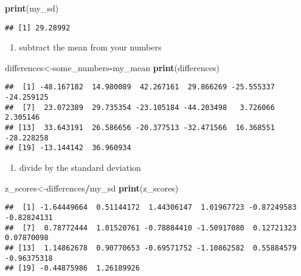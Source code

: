 \documentclass[
]{book}
\newenvironment{Shaded}{\begin{snugshade}}{\end{snugshade}}
\newcommand{\FunctionTok}[1]{\textcolor[rgb]{0.13,0.29,0.53}{\textbf{#1}}}
\newcommand{\NormalTok}[1]{#1}
\newcommand{\OtherTok}[1]{\textcolor[rgb]{0.56,0.35,0.01}{#1}}
\newcommand{\SpecialCharTok}[1]{\textcolor[rgb]{0.81,0.36,0.00}{\textbf{#1}}}
\providecommand{\tightlist}{%
  \setlength{\itemsep}{0pt}\setlength{\parskip}{0pt}}
\begin{document}
\begin{Shaded}
\begin{Highlighting}[]
\FunctionTok{print}\NormalTok{(my\_sd)}
\end{Highlighting}
\end{Shaded}

\begin{verbatim}
## [1] 29.28992
\end{verbatim}

\begin{enumerate}
\def\labelenumi{\arabic{enumi}.}
\setcounter{enumi}{2}
\tightlist
\item
  subtract the mean from your numbers
\end{enumerate}

\begin{Shaded}
\begin{Highlighting}[]
\NormalTok{differences}\OtherTok{\textless{}{-}}\NormalTok{some\_numbers}\SpecialCharTok{{-}}\NormalTok{my\_mean}
\FunctionTok{print}\NormalTok{(differences)}
\end{Highlighting}
\end{Shaded}

\begin{verbatim}
##  [1] -48.167182  14.980089  42.267161  29.866269 -25.555337 -24.259125
##  [7]  23.072389  29.735354 -23.105184 -44.203498   3.726066   2.305146
## [13]  33.643191  26.586656 -20.377513 -32.471566  16.368551 -28.228258
## [19] -13.144142  36.960934
\end{verbatim}

\begin{enumerate}
\def\labelenumi{\arabic{enumi}.}
\setcounter{enumi}{3}
\tightlist
\item
  divide by the standard deviation
\end{enumerate}

\begin{Shaded}
\begin{Highlighting}[]
\NormalTok{z\_scores}\OtherTok{\textless{}{-}}\NormalTok{differences}\SpecialCharTok{/}\NormalTok{my\_sd}
\FunctionTok{print}\NormalTok{(z\_scores)}
\end{Highlighting}
\end{Shaded}

\begin{verbatim}
##  [1] -1.64449664  0.51144172  1.44306147  1.01967723 -0.87249583 -0.82824131
##  [7]  0.78772444  1.01520761 -0.78884410 -1.50917080  0.12721323  0.07870098
## [13]  1.14862678  0.90770653 -0.69571752 -1.10862582  0.55884579 -0.96375318
## [19] -0.44875986  1.26189926
\end{verbatim}
\end{document}
